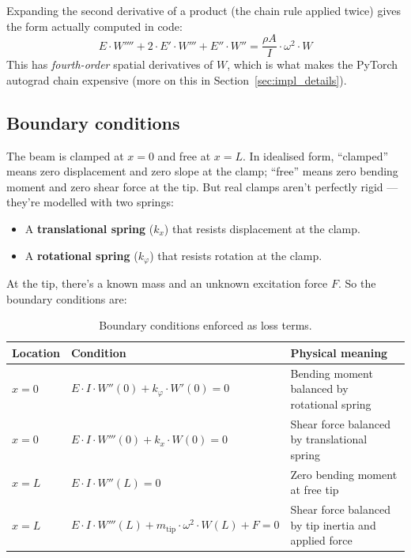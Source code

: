 \documentclass[11pt,a4paper]{article}
\begin{document}
Expanding the second derivative of a product (the chain rule applied twice) gives the form actually computed in code:
\begin{equation}
E \cdot W'''' + 2 \cdot E' \cdot W''' + E'' \cdot W'' = \frac{\rho A}{I} \cdot \omega^2 \cdot W
\label{eq:pde_expanded}
\end{equation}
This has \emph{fourth-order} spatial derivatives of $W$, which is what makes the PyTorch autograd chain expensive (more on this in Section~\ref{sec:impl_details}).

\subsection{Boundary conditions}

The beam is clamped at $x=0$ and free at $x=L$. In idealised form, ``clamped'' means zero displacement and zero slope at the clamp; ``free'' means zero bending moment and zero shear force at the tip. But real clamps aren't perfectly rigid --- they're modelled with two springs:
\begin{itemize}[leftmargin=*, itemsep=2pt]
\item A \textbf{translational spring} ($k_x$) that resists displacement at the clamp.
\item A \textbf{rotational spring} ($k_\varphi$) that resists rotation at the clamp.
\end{itemize}
At the tip, there's a known mass and an unknown excitation force $F$. So the boundary conditions are:

\begin{table}[h]
\centering
\small
\begin{tabularx}{\linewidth}{l l X}
\toprule
\textbf{Location} & \textbf{Condition} & \textbf{Physical meaning} \\
\midrule
$x=0$ & $E \cdot I \cdot W''(0) + k_\varphi \cdot W'(0) = 0$ & Bending moment balanced by rotational spring \\
$x=0$ & $E \cdot I \cdot W'''(0) + k_x \cdot W(0) = 0$ & Shear force balanced by translational spring \\
$x=L$ & $E \cdot I \cdot W''(L) = 0$ & Zero bending moment at free tip \\
$x=L$ & $E \cdot I \cdot W'''(L) + m_\text{tip} \cdot \omega^2 \cdot W(L) + F = 0$ & Shear force balanced by tip inertia and applied force \\
\bottomrule
\end{tabularx}
\caption{Boundary conditions enforced as loss terms.}
\end{table}
\end{document}
